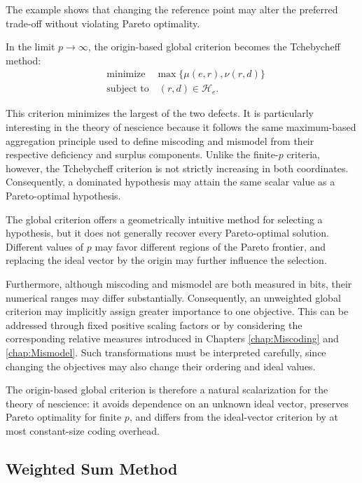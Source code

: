 The example shows that changing the reference point may alter the preferred trade-off without violating Pareto optimality.

In the limit $p\to\infty$, the origin-based global criterion becomes the Tchebycheff method:
\begin{align*}
& \text{minimize} \quad \max\{\mu(e,r),\nu(r,d)\}\\
& \text{subject to} \quad (r,d)\in\mathcal H_e.
\end{align*}

This criterion minimizes the largest of the two defects. It is particularly interesting in the theory of nescience because it follows the same maximum-based aggregation principle used to define miscoding and mismodel from their respective deficiency and surplus components. Unlike the finite-$p$ criteria, however, the Tchebycheff criterion is not strictly increasing in both coordinates. Consequently, a dominated hypothesis may attain the same scalar value as a Pareto-optimal hypothesis.

The global criterion offers a geometrically intuitive method for selecting a hypothesis, but it does not
generally recover every Pareto-optimal solution. Different values of $p$ may favor different regions
of the Pareto frontier, and replacing the ideal vector by the origin may further influence the selection.

Furthermore, although miscoding and mismodel are both measured in bits, their numerical ranges may differ substantially. Consequently, an unweighted global criterion may implicitly assign greater importance to one objective. This can be addressed through fixed positive scaling factors or by considering the corresponding relative measures introduced in Chapters \ref{chap:Miscoding} and \ref{chap:Mismodel}. Such transformations must be interpreted carefully, since changing the objectives may also change their ordering and ideal values.

The origin-based global criterion is therefore a natural scalarization for the theory of nescience: it avoids dependence on an unknown ideal vector, preserves Pareto optimality for finite $p$, and differs from the ideal-vector criterion by at most constant-size coding overhead.


\subsection*{Weighted Sum Method}
\label{sec:nescience_weighted_sum}

